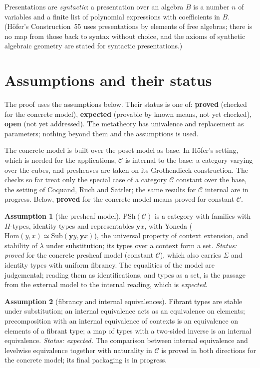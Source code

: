 \documentclass[11pt]{amsart}
\theoremstyle{definition}
\newtheorem{assumption}{Assumption}
\theoremstyle{remark}
\newcommand{\PSh}{\mathrm{PSh}}
\newcommand{\Hom}{\mathrm{Hom}}
\newcommand{\yo}{\mathbf{y}}
\begin{document}
Presentations are \emph{syntactic}: a presentation over an algebra $B$ is a
number $n$ of variables and a finite list of polynomial expressions with
coefficients in $B$. (H\"ofer's Construction~55 uses presentations by
elements of free algebras; there is no map from those back to syntax
without choice, and the axioms of synthetic algebraic geometry are stated
for syntactic presentations.)

\section{Assumptions and their status}\label{sec:assumptions}

The proof uses the assumptions below. Their status is one of:
\textbf{proved} (checked for the concrete model), \textbf{expected}
(provable by known means, not yet checked), \textbf{open} (not yet
addressed). The metatheory has univalence and replacement as parameters;
nothing beyond them and the assumptions is used.

The concrete model is built over the poset model as base. In H\"ofer's
setting, which is needed for the applications, $\mathcal C$ is internal to
the base: a category varying over the cubes, and presheaves are taken on its
Grothendieck construction. The checks so far treat only the special case of
a category $\mathcal C$ constant over the base, the setting of Coquand,
Ruch and Sattler; the same results for $\mathcal C$ internal are in
progress. Below, \textbf{proved} for the concrete model means proved for
constant $\mathcal C$.

\begin{assumption}[the presheaf model]\label{a:cwf}
$\PSh(\mathcal C)$ is a category with families with $\Pi$-types,
identity types and representables $\yo x$, with Yoneda
($\Hom(y,x)\simeq\mathrm{Sub}(\yo y,\yo x)$), the universal property of
context extension, and stability of $\lambda$ under substitution; its
types over a context form a set.
\emph{Status: proved} for the concrete presheaf model (constant $\mathcal C$),
which also carries $\Sigma$ and identity types with uniform fibrancy.
The equalities of the model are judgemental; reading them as
identifications, and types as a set, is the passage from the external
model to the internal reading, which is \emph{expected}.
\end{assumption}

\begin{assumption}[fibrancy and internal equivalences]\label{a:fib}
Fibrant types are stable under substitution; an internal equivalence acts
as an equivalence on elements; precomposition with an internal
equivalence of contexts is an equivalence on elements of a fibrant type;
a map of types with a two-sided inverse is an internal equivalence.
\emph{Status: expected.} The comparison between internal equivalence and
levelwise equivalence together with naturality in $\mathcal C$ is proved
in both directions for the concrete model; its final packaging is in
progress.
\end{assumption}
\end{document}
